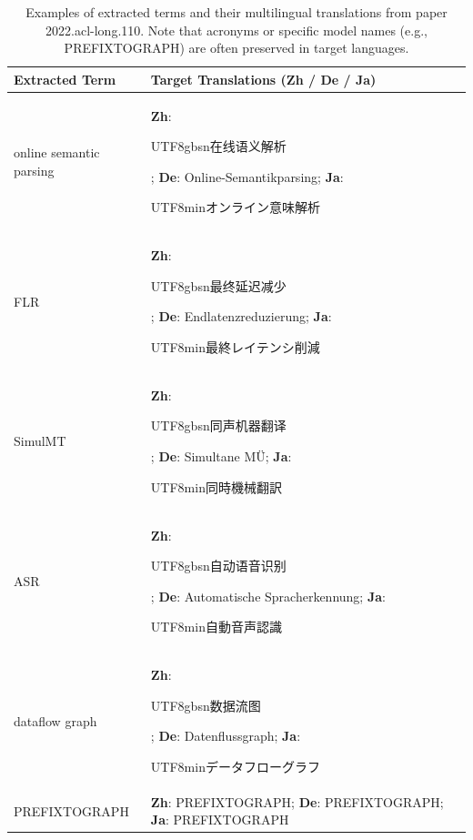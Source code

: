\begin{table}[h]
\centering
\small
\begin{tabular}{l|p{9cm}}
\toprule
\textbf{Extracted Term} & \textbf{Target Translations (Zh / De / Ja)} \\
\midrule
online semantic parsing & \textbf{Zh}: \begin{CJK*}{UTF8}{gbsn}在线语义解析\end{CJK*}; \textbf{De}: Online-Semantikparsing; \textbf{Ja}: \begin{CJK*}{UTF8}{min}オンライン意味解析\end{CJK*} \\
\midrule
FLR & \textbf{Zh}: \begin{CJK*}{UTF8}{gbsn}最终延迟减少\end{CJK*}; \textbf{De}: Endlatenzreduzierung; \textbf{Ja}: \begin{CJK*}{UTF8}{min}最終レイテンシ削減\end{CJK*} \\
\midrule
SimulMT & \textbf{Zh}: \begin{CJK*}{UTF8}{gbsn}同声机器翻译\end{CJK*}; \textbf{De}: Simultane MÜ; \textbf{Ja}: \begin{CJK*}{UTF8}{min}同時機械翻訳\end{CJK*} \\
\midrule
ASR & \textbf{Zh}: \begin{CJK*}{UTF8}{gbsn}自动语音识别\end{CJK*}; \textbf{De}: Automatische Spracherkennung; \textbf{Ja}: \begin{CJK*}{UTF8}{min}自動音声認識\end{CJK*} \\
\midrule
dataflow graph & \textbf{Zh}: \begin{CJK*}{UTF8}{gbsn}数据流图\end{CJK*}; \textbf{De}: Datenflussgraph; \textbf{Ja}: \begin{CJK*}{UTF8}{min}データフローグラフ\end{CJK*} \\
\midrule
PREFIXTOGRAPH & \textbf{Zh}: PREFIXTOGRAPH; \textbf{De}: PREFIXTOGRAPH; \textbf{Ja}: PREFIXTOGRAPH \\
\bottomrule
\end{tabular}
\caption{Examples of extracted terms and their multilingual translations from paper 2022.acl-long.110. Note that acronyms or specific model names (e.g., PREFIXTOGRAPH) are often preserved in target languages.}
\label{tab:extracted_examples}
\end{table}

